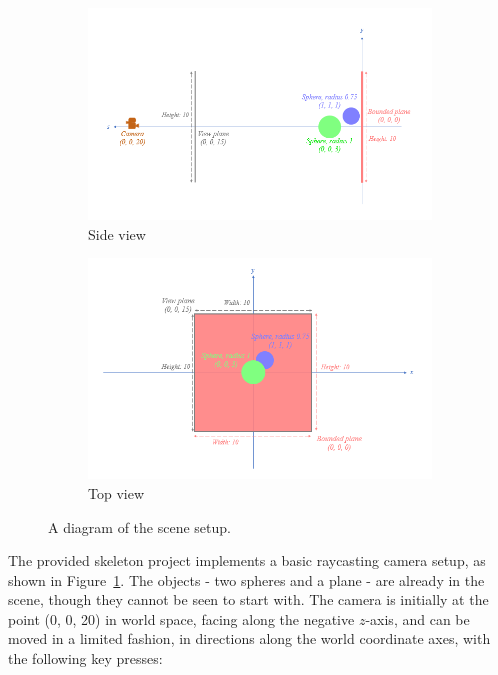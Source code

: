 \documentclass{../../../fal_assignment}
\begin{document}
\begin{figure}[ht]
	\begin{center}
		\begin{subfigure}[b]{0.45\linewidth}
			\includegraphics[width=\linewidth]{scene_side}
			\caption{Side view}
		\end{subfigure}
		\begin{subfigure}[b]{0.45\linewidth}
			\includegraphics[width=\linewidth]{scene_top}
			\caption{Top view}
		\end{subfigure}
	\end{center}
	\caption{A diagram of the scene setup.}
	\label{fig:scene}
\end{figure}

The provided skeleton project implements a basic raycasting camera setup, as shown in Figure~\ref{fig:scene}.
The objects - two spheres and a plane - are already in the scene, though they cannot be seen to start with. The camera is initially at the point (0, 0, 20) in world space, facing along the negative $z$-axis, and can be moved in a limited fashion, in directions along the world coordinate axes, with the following key presses:
\end{document}
